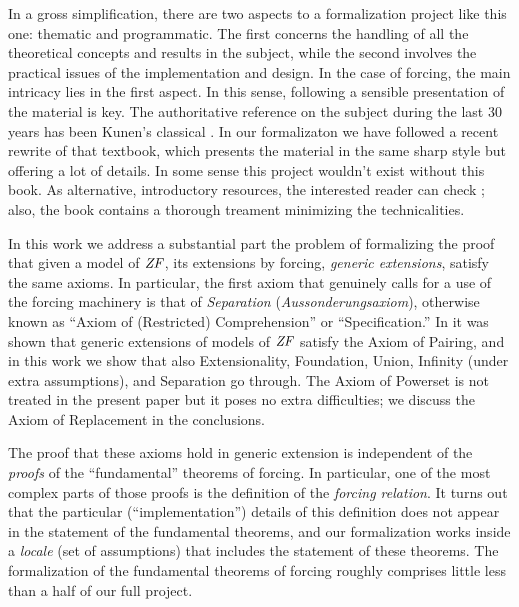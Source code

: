 
In a gross simplification, there are two aspects to a formalization
project like this one: thematic and programmatic. The first concerns
the handling of all the theoretical concepts and results in the
subject, while the second involves the practical issues of the
implementation and design. In the case of forcing, the main intricacy
lies in the first aspect. In this sense, following a sensible
presentation of the material is key.  The authoritative reference 
on the subject during the last 30 years has been Kunen's classical
\cite{kunen1980}. In our
formalizaton we have followed a recent rewrite \cite{kunen2011set}
of that  textbook, which presents the material in the same sharp 
style but offering a lot of details. In some sense this project
wouldn't exist without this book. As alternative, introductory
resources, the  interested reader can check
\cite{chow-beginner-forcing}; also, the book \cite{weaver2014forcing}
contains a thorough treament minimizing the technicalities.


In this work we address a substantial part the problem of formalizing
the proof that given a model of $\mathit{ZF}$, its extensions by forcing, 
\emph{generic extensions},
satisfy the same axioms. In particular, the first axiom that
genuinely calls for a use of the forcing machinery is that of
\emph{Separation} (\emph{Aussonderungsaxiom}), otherwise known as
``Axiom of (Restricted) Comprehension''  or ``Specification.'' In
\cite{2018arXiv180705174G} it was shown that  generic extensions of
models of $\mathit{ZF}$ 
satisfy the Axiom of Pairing, and in this work we show that also
Extensionality, Foundation, Union, Infinity (under extra assumptions),
and Separation go through. The
Axiom of Powerset is not treated in the present paper but it poses no
extra difficulties; we discuss the Axiom of Replacement in the
conclusions. 

The proof that these axioms hold in generic extension is independent
of the \emph{proofs} of the ``fundamental'' theorems of forcing. In
particular, one of the most complex parts of those proofs is the
definition of the \emph{forcing relation}. It turns out that the
particular (``implementation'') details of this  definition  does not
appear in the statement of the fundamental theorems, and our
formalization works inside a \emph{locale} (set of assumptions) that
includes the statement of these theorems. The formalization of the
fundamental theorems of forcing roughly comprises little less than a
half of our full project. 

